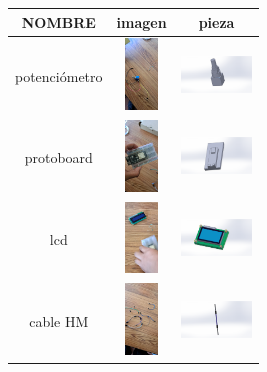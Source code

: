     \begin{table} [H]
          
      \huge
      \tiny 
      \begin{tabular}   {| c |  c |  c | }
      
      \hline
      NOMBRE & imagen  & pieza \\
      \hline 
      potenciómetro  &  \includegraphics[height=19mm]{7/img/potenciometro.jpg}  & 
       \includegraphics[width=19mm]{7/img/piezaaauno.PNG} \\
        \hline
      protoboard &  \includegraphics[height=19mm]{7/img/protoboard.jpg}  & 
       \includegraphics[width=19mm]{7/img/Piezauno.PNG} \\
        \hline
        lcd & \includegraphics[height=19mm]{7/img/lcd.jpg}  & 
       \includegraphics[width=19mm]{7/img/piezatress.PNG} \\
        \hline
        cable HM & \includegraphics [height=19mm]{7/img/cables.jpg}  & 
       \includegraphics[width=19mm]{7/img/cuatrooo.PNG} \\

\end{tabular}
\end{table}
